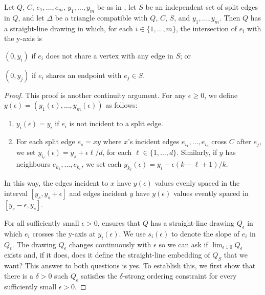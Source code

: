 \documentclass{patmorin}
\begin{document}
\begin{thm}
   Let $Q$, $C$, $e_1,\ldots,e_m$, $y_1,\ldots,y_m$ be as in
  , let $S$ be an independent set of split edges in $Q$,
  and let $\Delta$ be a triangle compatible with $Q$, $C$, $S$, and
  $y_1,\ldots,y_m$.  Then $Q$ has a straight-line drawing in which, for
  each $i\in\{1,\ldots,m\}$, the intersection of $e_i$ with the y-axis is
  \begin{compactenum}
     \item $(0,y_i)$ if $e_i$ does not share a vertex with any edge in $S$; or
     \item $(0,y_j)$ if $e_i$ shares an endpoint with $e_j\in S$.
  \end{compactenum}
\end{thm}

\begin{proof}
  This proof is another continuity argument. For any $\epsilon \ge 0$, we define
  $y(\epsilon)=(y_1(\epsilon),\ldots,y_m(\epsilon))$ as follows:
  \begin{enumerate}
    \item $y_i(\epsilon)= y_i$ if $e_i$ is not incident to a split edge.
    \item For each split edge $e_s=xy$ where $x$'s incident edges
  $e_{i_1},\ldots,e_{i_d}$ cross $C$ after $e_j$, we
  set $y_{i_\ell}(\epsilon)=y_s+\epsilon\ell/d$, for each
  $\ell\in\{1,\ldots,d\}$.  Similarly, if $y$ has neighbours
  $e_{k_1},\ldots,e_{k_r}$, we set each $y_{k_\ell}(\epsilon)=y_i -
  \epsilon(k-\ell+1)/k$. 
  \end{enumerate}
  In this way, the edges incident to $x$ have $y(\epsilon)$ values evenly
  spaced in the interval $[y_s,y_s+\epsilon]$ and edges incident $y$
  have $y(\epsilon)$ values evently spaced in $[y_s-\epsilon,y_s]$.

  For all sufficiently small $\epsilon >0$,  ensures that
  $Q$ has a straight-line drawing $Q_\epsilon$ in which $e_i$ crosses
  the y-axis at $y_i(\epsilon)$. We use $s_i(\epsilon)$ to denote the
  slope of $e_i$ in $Q_\epsilon$.  The drawing $Q_\epsilon$ changes
  continuously with $\epsilon$ so we can ask if $\lim_{\epsilon\downarrow
  0}Q_\epsilon$ exists and, if it does, does it define the straight-line 
  embedding of $Q_S$ that
  we want?  This answer to both questions is yes.  To establish this,
  we first show that there is a $\delta>0$ such $Q_\epsilon$ satisfies
  the $\delta$-strong ordering constraint for every sufficiently small
  $\epsilon >0$.


\end{proof}
\end{document}
